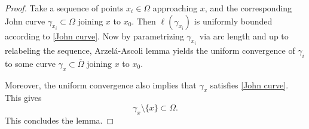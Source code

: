 \documentclass[10pt,a4paper]{amsart}
\def\gz{{\gamma}}
\begin{document}
\begin{proof}
     Take a sequence of points $x_i\in \Omega$ approaching $x$,  and the corresponding John curve $\gz_{x_i}\subset \Omega$ joining $x$ to $x_0$. Then $\ell(\gz_{x_i})$ is uniformly bounded according to \eqref{John curve}. Now by parametrizing $\gamma_{x_i}$ via arc length and up to relabeling the sequence, Arzel\'a-Ascoli lemma yields the uniform convergence of  $\gz_i$ to some curve $\gz_x\subset \overline{\Omega}$ joining $x$ to $x_0$. 
     
Moreover, the uniform convergence also implies that $\gz_x$  satisfies \eqref{John curve}. This gives 
$$\gz_x\setminus\{x\}\subset \Omega.$$ 
This concludes the lemma.  
\end{proof}
\end{document}
